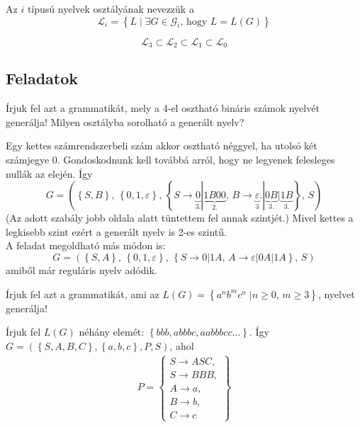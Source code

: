\begin{definition*}[nyelvosztály]
	Az $i$ típusú nyelvek osztályának nevezzük a 
	\[
	\mathcal{L}_i = \left\lbrace L \; | \; \exists G \in \mathcal{G}_i \text{, hogy } L = L(G) \right\rbrace 
	\]
\end{definition*}

\begin{theorem}
	\[
		\mathcal{L}_3 \subset \mathcal{L}_2 \subset \mathcal{L}_1 \subset \mathcal{L}_0
	\]
\end{theorem}

\subsection{Feladatok}
\setcounter{exercise}{0}
\begin{exercise}
	Írjuk fel azt a grammatikát, mely a 4-el osztható bináris számok nyelvét generálja! Milyen osztályba sorolható a generált nyelv?
\end{exercise}

\begin{solution}
	Egy kettes számrendszerbeli szám akkor osztható néggyel, ha utolsó két számjegye 0. Gondoskodnunk kell továbbá arról, hogy ne legyenek felesleges nullák az elején. Így
	\[
	G = \left( \left\lbrace S, B \right\rbrace, \, \left\lbrace 0,1, \varepsilon \right\rbrace, \, \left\lbrace  S \rightarrow \underbrace{0}_{3.} | \underbrace{1B00}_{2.}, \,  B \rightarrow \underbrace{\varepsilon}_3.|\underbrace{0B}_{3.}|\underbrace{1B}_{3.} \right\rbrace , \, S \right)
	\]
	(Az adott szabály jobb oldala alatt tüntettem fel annak szintjét.) Mivel kettes a legkisebb szint ezért a generált nyelv is 2-es szintű.
	\\[4pt]
	A feladat megoldható más módon is:
	\[
	G = \left( \left\lbrace S, A \right\rbrace, \, \left\lbrace 0,1, \varepsilon \right\rbrace, \, \left\lbrace  S \rightarrow 0 | 1A, \,  A \rightarrow \varepsilon|0A|1A \right\rbrace , \, S \right)
	\]
	amiből már reguláris nyelv adódik.
\end{solution}

\begin{exercise}
	Írjuk fel azt a grammatikát, ami az $ L(G) = \left\lbrace a^n b^m c^n \; | n \ge 0, \, m \ge 3 \right\rbrace  $, nyelvet generálja!
\end{exercise}
\begin{solution}
	Írjuk fel $L(G)$ néhány elemét: $ \left\lbrace bbb, abbbc, aabbbcc \dots \right\rbrace $. Így $ G = (\left\lbrace  S,A,B,C \right\rbrace , \left\lbrace a,b,c \right\rbrace, P, S) $, ahol
	\begin{align*}
		P = \left\lbrace \begin{array}{l}
			S \rightarrow ASC, \\
			S \rightarrow BBB, \\
			A \rightarrow a, \\
			B \rightarrow b, \\
			C \rightarrow c
		\end{array} \right\rbrace 
	\end{align*}
\end{solution}